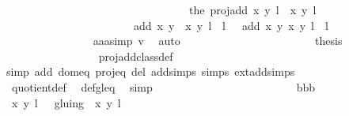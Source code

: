 \begin{isabellebody}
\ \ \ \ \ \ \ \ \ \ \ \ \ \ \ \ \ \ \ \ \ \ \ \ \ \ \ \ \ \ \ \ \ the\ {\isacharparenleft}proj{\isacharunderscore}add\ {\isacharparenleft}{\isacharparenleft}x{\isacharcomma}\ y{\isacharparenright}{\isacharcomma}\ l{\isacharparenright}\ {\isacharparenleft}{\isasymtau}\ {\isacharparenleft}x{\isacharprime}{\isacharcomma}\ y{\isacharprime}{\isacharparenright}{\isacharcomma}\ l{\isacharprime}\ {\isacharplus}\ {}{\isacharparenright}{\isacharparenright}{\isacharbraceright}\ {\isacharequal}\isanewline
\ \ \ \ \ \ \ \ \ \ \ \ \ \ \ \ \ \ \ \ \ \ \ {\isacharbraceleft}{\isacharparenleft}add\ {\isacharparenleft}x{\isacharcomma}\ y{\isacharparenright}\ {\isacharparenleft}{\isasymtau}\ {\isacharparenleft}x{\isacharprime}{\isacharcomma}\ y{\isacharprime}{\isacharparenright}{\isacharparenright}{\isacharcomma}\ l\ {\isacharplus}\ l{\isacharprime}\ {\isacharplus}\ {}{\isacharparenright}{\isacharcomma}\ {\isacharparenleft}add\ {\isacharparenleft}x{\isacharcomma}\ y{\isacharparenright}\ {\isacharparenleft}x{\isacharprime}{\isacharcomma}\ y{\isacharprime}{\isacharparenright}{\isacharcomma}\ l\ {\isacharplus}\ l{\isacharprime}{\isacharparenright}{\isacharbraceright}{\isachardoublequoteclose}\isanewline
\ \ \ \ \ \ \ \ \ \ \ \ \ \ \isamarkupfalse%
\ aaa{\isacharunderscore}simp\ v{}\ \isamarkupfalse%
\ auto\ \ \ \ \ \ \ \ \ \ \isanewline
\ \ \ \ \ \ \ \ \ \ \ \ \isamarkupfalse%
\ {\isacharquery}thesis\isanewline
\ \ \ \ \ \ \ \ \ \ \ \ \ \ \isamarkupfalse%
\ {}\ proj{\isacharunderscore}add{\isacharunderscore}class{\isacharunderscore}def\ \isamarkupfalse%
{\isacharparenleft}simp\ add{\isacharcolon}\ dom{\isacharunderscore}eq\ proj{\isacharunderscore}eq\ del{\isacharcolon}\ add{\isachardot}simps\ {\isasymtau}{\isachardot}simps\ ext{\isacharunderscore}add{\isachardot}simps{\isacharparenright}\isanewline
\ \ \ \ \ \ \ \ \ \ \ \ \ \ \isamarkupfalse%
\ quotient{\isacharunderscore}def\ \isamarkupfalse%
\ def{\isacharunderscore}gl{\isacharunderscore}eq\ \isamarkupfalse%
\ simp\ \isanewline
\ \ \ \ \ \ \ \ \ \ \isamarkupfalse%
\isanewline
\ \ \ \ \ \ \ \ \ \ \ \ \isamarkupfalse%
\ bbb\isanewline
\ \ \ \ \ \ \ \ \ \ \ \ \isamarkupfalse%
\ {\isachardoublequoteopen}{\isacharbraceleft}{\isacharparenleft}{\isacharparenleft}x{\isacharcomma}\ y{\isacharparenright}{\isacharcomma}\ l{\isacharparenright}{\isacharbraceright}\ \ {\isacharslash}{\isacharslash}\ gluing\ {\isacharequal}\ {\isacharbraceleft}{\isacharbraceleft}{\isacharparenleft}{\isacharparenleft}x{\isacharcomma}\ y{\isacharparenright}{\isacharcomma}\ l{\isacharparenright}{\isacharbraceright}\ {\isacharbraceright}{\isachardoublequoteclose}\isanewline

\end{isabellebody}
